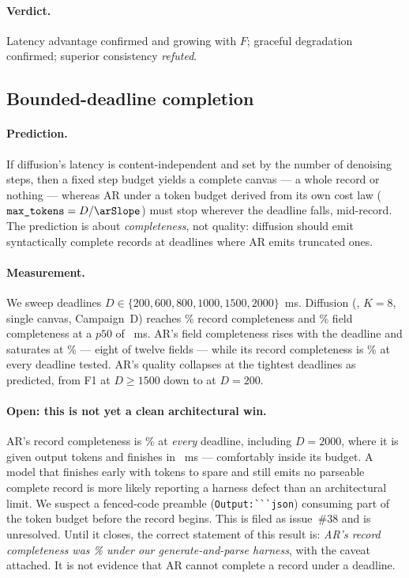 \paragraph{Verdict.} Latency advantage confirmed and growing with $F$; graceful
degradation confirmed; superior consistency \emph{refuted}.

\subsection{Bounded-deadline completion}
\label{sec:app-deadline}

\paragraph{Prediction.} If diffusion's latency is content-independent and set by
the number of denoising steps, then a fixed step budget yields a complete
canvas --- a whole record or nothing --- whereas AR under a token budget derived
from its own cost law ($\texttt{max\_tokens} = D / \arSlope$) must stop wherever
the deadline falls, mid-record. The prediction is about \emph{completeness},
not quality: diffusion should emit syntactically complete records at deadlines
where AR emits truncated ones.

\paragraph{Measurement.} We sweep deadlines $D \in \{200, 600, 800, 1000, 1500,
2000\}$~ms. Diffusion (\modelLLaDA{}, $K=8$, single canvas, Campaign~D)
reaches \dmRecordComplete\% record completeness and \dmRecordComplete\% field
completeness at a $p50$ of ~ms. AR's field
completeness rises with the deadline and saturates at \arFieldCompleteMax\%
--- eight of twelve fields --- while its record completeness is
\arRecordComplete\% at every deadline tested. AR's quality collapses at the
tightest deadlines as predicted, from \arDeadlineFOne{} F1 at $D \geq 1500$ down
to  at $D=200$.

\paragraph{Open: this is not yet a clean architectural win.} AR's record
completeness is \arRecordComplete\% at \emph{every} deadline, including
$D=2000$, where it is given  output tokens and
finishes in ~ms --- comfortably inside its
budget. A model that finishes early with tokens to spare and still emits no
parseable complete record is more likely reporting a harness defect than an
architectural limit. We suspect a fenced-code preamble
(\verb|Output:```json|) consuming
part of the token budget before the record begins. This is filed as issue~\#38
and is unresolved.  Until it closes, the correct statement of this
result is: \emph{AR's record completeness was \arRecordComplete\% under our
generate-and-parse harness}, with the caveat attached. It is not evidence that
AR cannot complete a record under a deadline.

